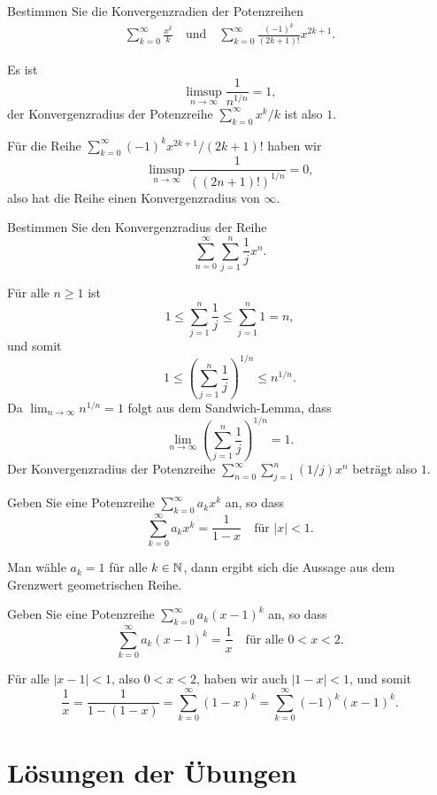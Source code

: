 \documentclass[a4paper,10pt]{article}
\begin{document}
\begin{question}
 Bestimmen Sie die Konvergenzradien der Potenzreihen
 \begin{align*}
  \sum_{k=0}^\infty \frac{x^k}{k}
  \quad
  \text{und}
  \quad
  \sum_{k=0}^\infty \frac{(-1)^k}{(2k+1)!} x^{2k+1}.
 \end{align*}
\end{question}
\begin{solution}
 Es ist
 \[
  \limsup_{n \to \infty} \frac{1}{n^{1/n}} = 1,
 \]
 der Konvergenzradius der Potenzreihe $\sum_{k=0}^\infty x^k/k$ ist also $1$.
 
 Für die Reihe $\sum_{k=0}^\infty (-1)^k x^{2k+1}/(2k+1)!$ haben wir
 \[
  \limsup_{n \to \infty} \frac{1}{((2n+1)!)^{1/n}}
  = 0,
 \]
 also hat die Reihe einen Konvergenzradius von $\infty$.
\end{solution}


\begin{question}
 Bestimmen Sie den Konvergenzradius der Reihe
 \[
  \sum_{n=0}^\infty \sum_{j=1}^n \frac{1}{j} x^n.
 \]
\end{question}
\begin{solution}
 Für alle $n \geq 1$ ist
 \[
  1 \leq \sum_{j=1}^n \frac{1}{j} \leq \sum_{j=1}^n 1 = n,
 \]
 und somit
 \[
  1 \leq \left( \sum_{j=1}^n \frac{1}{j} \right)^{1/n} \leq n^{1/n}.
 \]
 Da $\lim_{n \to \infty} n^{1/n} = 1$ folgt aus dem Sandwich-Lemma, dass
 \[
  \lim_{n \to \infty} \left( \sum_{j=1}^n \frac{1}{j} \right)^{1/n} = 1.
 \]
 Der Konvergenzradius der Potenzreihe $\sum_{n=0}^\infty \sum_{j=1}^n (1/j) x^n$ beträgt also $1$.
\end{solution}


\begin{question}
Geben Sie eine Potenzreihe $\sum_{k=0}^\infty a_k x^k$ an, so dass
\[
 \sum_{k=0}^\infty a_k x^k = \frac{1}{1-x} \quad \text{für $|x| < 1$}.
\]
\end{question}
\begin{solution}
 Man wähle $a_k = 1$ für alle $k \in \mathbb{N}$, dann ergibt sich die Aussage aus dem Grenzwert geometrischen Reihe.
\end{solution}


\begin{question}
 Geben Sie eine Potenzreihe $\sum_{k=0}^\infty a_k (x-1)^k$ an, so dass
 \[
  \sum_{k=0}^\infty a_k (x-1)^k = \frac{1}{x} \quad \text{für alle $0 < x < 2$}.
 \]
\end{question}
\begin{solution}
 Für alle $|x-1| < 1$, also $0 < x < 2$, haben wir auch $|1-x| < 1$, und somit
 \[
  \frac{1}{x}
  = \frac{1}{1-(1-x)}
  = \sum_{k=0}^\infty (1-x)^k
  = \sum_{k=0}^\infty (-1)^k (x-1)^k.
 \]
\end{solution}















\newpage





\section{Lösungen der Übungen}

\printsolutions
\end{document}
